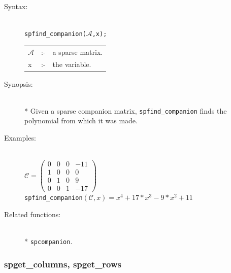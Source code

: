 \begin{description}
\item[Syntax:]\mbox{}\\
{\tt spfind\_companion($\mathcal{A}$,x);}\\[2mm]
\begin{tabular}{l l l}
$\mathcal{A}$ &:-& a sparse matrix. \\
x          &:-& the variable.
\end{tabular}

\item[Synopsis:]\mbox{}\\*
  Given a sparse companion matrix, \texttt{spfind\_companion} finds the polynomial
from which it was made.

\item[Examples:]\mbox{}\\
\(\mathcal{C} = \begin{pmatrix} 0 & 0 & 0 & -11 \\ 1 & 0 & 0 & 0
\\ 0 & 1 & 0 & 9 \\ 0 & 0 & 1 & -17
\end{pmatrix}\) \\[2mm]
\texttt{spfind\_companion}\((\mathcal{C},x) = x^4+17*x^3-9*x^2+11\)

\item[Related functions:]\mbox{}\\*
 \texttt{spcompanion}.
\end{description}

\subsubsection{spget\_columns, spget\_rows}
\label{sparse:spget_columns}
\hypertarget{operator:SPGET_COLUMNS}{}

